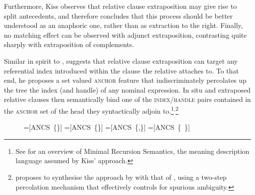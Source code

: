 \documentclass[output=paper
                ,modfonts
                ,nonflat
	        ,collection
	        ,collectionchapter
	        ,collectiontoclongg
 	        ,biblatex
                ,babelshorthands
                ,newtxmath
                ,draftmode
                ,colorlinks, citecolor=brown
]{./langsci/langscibook}
\begin{document}
{Furthermore, Kiss observes that relative clause extraposition may give
rise to split antecedents, and therefore concludes that this process
should be better understood as an anaphoric one, rather than as
extraction to the right. Finally, no matching effect can be observed
with adjunct extraposition, contrasting quite sharply with
extraposition of complements.


Similar in spirit to \citet{culicover90:_extrap_and_compl_princ},
\citet{kiss_t02nllt} suggests that relative clause extraposition can
target any referential index introduced within the clause the relative
attaches to.  To that end, he proposes a set valued \textsc{anchor}
feature that indiscriminately percolates up the tree the index (and
handle) of any nominal expression. In situ and extraposed relative
clauses then semantically bind one of the \textsc{index/handle} pairs
contained in the \textsc{anchor} set of the head they syntactically
adjoin to.\footnote{See
  for an overview of Minimal Recursion Semantics, the meaning
  description language assumed by Kiss'
  approach.}$^,$\footnote{\citet{crysmann_b04rlc} proposes to
  synthesise the approach by \citet{kiss_t02nllt} with that of
  \citet{Keller:95}, using a two-step percolation mechanism that
  effectively controls for spurious ambiguity.}

\begin{figure}
  
  { \newbox\onebox \newbox\twobox \newbox\onetwobox \newbox\emptybox

    \setbox\onebox=\hbox{[\textsc{ANCS} \{\}]}
    \setbox\twobox=\hbox{[\textsc{ANCS} \{\}]}
    \setbox\onetwobox=\hbox{[\textsc{ANCS} \{,\}]}
    \setbox\emptybox=\hbox{[\textsc{ANCS} \{ \}]}

\tikzexternaldisable
    
}





\end{figure}}
\end{document}
